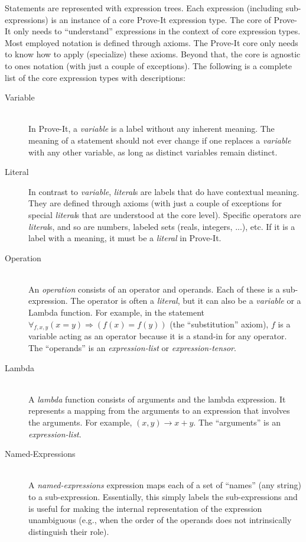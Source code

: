 \documentclass{article}[12pt]
\begin{document}
Statements are represented with expression trees.  Each expression (including sub-expressions) is an instance of a core Prove-It expression type.  The core of Prove-It only needs to “understand” expressions in the context of core expression types.  Most employed notation is defined through axioms.  The Prove-It core only needs to know how to apply (specialize) these axioms.  Beyond that, the core is agnostic to ones notation (with just a couple of exceptions).  The following is a complete list of the core expression types with descriptions:
\begin{description}
\item[Variable] \hfill \\
  In Prove-It, a {\em variable} is a label without any inherent meaning.  The meaning of a statement should not ever change if one replaces a {\em variable} with any other variable, as long as distinct variables remain distinct.
\item[Literal]  In contrast to {\em variable}, {\em literal}s are labels that do have contextual meaning.  They are defined through axioms (with just a couple of exceptions for special {\em literal}s that are understood at the core level).  Specific operators are {\em literal}s, and so are numbers, labeled sets (reals, integers, ...), etc.  If it is a label with a meaning, it must be a {\em literal} in Prove-It.
\item[Operation] \hfill \\
  An {\em operation} consists of an operator and operands.  Each of these is a sub-expression.  The operator is often a {\em literal}, but it can also be a {\em variable} or a Lambda function.  For example, in the statement
  $\forall_{f, x, y} (x = y) \Rightarrow (f(x) = f(y))$ (the “substitution” axiom), $f$ is a variable acting as an operator because it is a stand-in for any operator.  The “operands” is an {\em expression-list} or {\em expression-tensor}.
\item[Lambda] \hfill \\
  A {\em lambda} function consists of arguments and the lambda expression.  It represents a mapping from the arguments to an expression that involves the arguments.  For example, $(x,y) \rightarrow x+y$.  The “arguments” is an {\em expression-list}.
\item[Named-Expressions] \hfill \\
  A {\em named-expressions} expression maps each of a set of “names” (any string) to a sub-expression.  Essentially, this simply labels the sub-expressions and is useful for making the internal representation of the expression unambiguous (e.g., when the order of the operands does not intrinsically distinguish their role).

\end{description}
\end{document}
